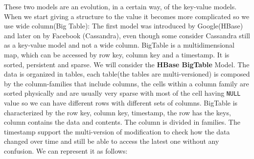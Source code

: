 \documentclass[a4page, 11pt]{article}
\begin{document}
These two models are an evolution, in a certain way, of the key-value models. When we start giving a structure to the value it becomes more complicated so we use wide column(Big Table): The first model was introduced by Google(HBase) and later on by Facebook (Cassandra), even though some consider Cassandra still  as a key-value model and not a wide column.
\newline
BigTable is a multidimensional map, which can be accessed by row key, column key and a timestamp. It is sorted, persistent and sparse.
We will consider the \textbf{HBase BigTable} Model.
The data is organized in tables, each table(the tables are multi-versioned) is composed by the column-families that include columns, the cells within a column family are sorted physically and are usually very sparse with most of the cell having \texttt{NULL} value so we can have different rows with different sets of columns. 
BigTable is characterized by the row key, column key, timestamp, the row has the keys, column contains the data and contents. 
The column is divided in families. The timestamp support the multi-version of modification to check how the data changed over time and still be able to access the latest one without any confusion. We can represent it as follows:
\end{document}
